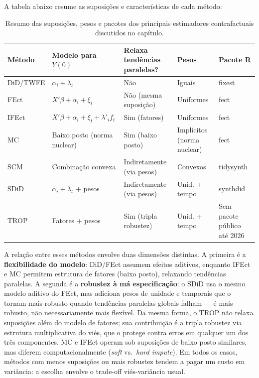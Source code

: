 \documentclass[
]{article}
\begin{document}
A tabela abaixo resume as suposições e características de cada método:

\begin{table}

\caption{\label{tab:tabela-guia-metodos-scm}Resumo das suposições, pesos e pacotes dos principais estimadores contrafactuais discutidos no capítulo.}
\centering
\begin{tabular}[t]{l|l|l|l|l}
\hline
Método & Modelo para $Y(0)$ & Relaxa tendências paralelas? & Pesos & Pacote R\\
\hline
DiD/TWFE & $\alpha_i + \lambda_t$ & Não & Iguais & fixest\\
\hline
FEct & $X'\beta + \alpha_i + \xi_t$ & Não (mesma suposição) & Uniformes & fect\\
\hline
IFEct & $X'\beta + \alpha_i + \xi_t + \lambda'_i f_t$ & Sim (fatores) & Uniformes & fect\\
\hline
MC & Baixo posto (norma nuclear) & Sim (baixo posto) & Implícitos (norma nuclear) & fect\\
\hline
SCM & Combinação convexa & Indiretamente (via pesos) & Convexos & tidysynth\\
\hline
SDiD & $\alpha_i + \lambda_t$ + pesos & Indiretamente (via pesos) & Unid. + tempo & synthdid\\
\hline
TROP & Fatores + pesos & Sim (tripla robustez) & Unid. + tempo & Sem pacote público até 2026\\
\hline
\end{tabular}
\end{table}

A relação entre esses métodos envolve duas dimensões distintas. A primeira é a \textbf{flexibilidade do modelo}: DiD/FEct assumem efeitos aditivos, enquanto IFEct e MC permitem estrutura de fatores (baixo posto), relaxando tendências paralelas. A segunda é a \textbf{robustez à má especificação}: o SDiD usa o mesmo modelo aditivo do FEct, mas adiciona pesos de unidade e temporais que o tornam mais robusto quando tendências paralelas globais falham --- é mais robusto, não necessariamente mais flexível. Da mesma forma, o TROP não relaxa suposições além do modelo de fatores; sua contribuição é a tripla robustez via estrutura multiplicativa do viés, que o protege contra erros em qualquer um dos três componentes. MC e IFEct operam sob suposições de baixo posto similares, mas diferem computacionalmente (\emph{soft} vs.~\emph{hard impute}). Em todos os casos, métodos com menos suposições ou mais robustez tendem a pagar um custo em variância: a escolha envolve o trade-off viés-variância usual.
\end{document}
